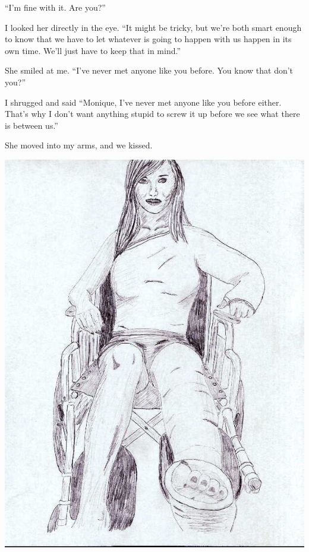 ``I'm fine with it. Are you?''

I looked her directly in the eye. ``It might be tricky, but we're both smart enough to
know that we have to let whatever is going to happen with us happen in its own time. We'll just
have to keep that in mind.''


She smiled at me. ``I've never met anyone like you before. You know that don't you?''

I shrugged and said ``Monique, I've never met anyone like you before either. That's why I
don't want anything stupid to screw it up before we see what there is between us.''

She moved into my arms, and we kissed.

\begin{center}
\includegraphics{images/kicks28.jpg}
\end{center}

